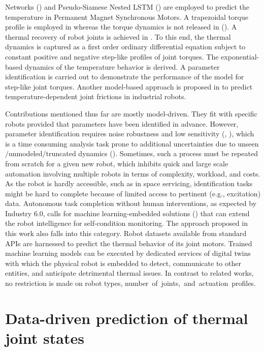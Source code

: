 \documentclass{ifacconf}
\begin{document}
Networks (\cite{he2024rotor})  and   Pseudo-Siamese Nested LSTM (\cite{cai2021temperature}) are employed to predict the temperature in Permanent Magnet Synchronous Motors. A trapezoidal torque profile is employed in \cite{he2024rotor} whereas the torque dynamics is not released in (\cite{cai2021temperature}). A thermal recovery of robot joints is achieved in  \cite{jorgensen2019thermal}. To this end, the thermal dynamics is captured as a first order ordinary differential equation subject to constant positive and negative step-like profiles of joint torques. The exponential-based dynamics of the temperature behavior is derived.  A parameter identification is carried out to demonstrate the performance of the model for step-like joint torques. Another model-based approach is proposed in \cite{trinh2023modeling} to predict temperature-dependent joint frictions in industrial robots.

Contributions mentioned thus far are mostly model-driven. They fit  with specific robots provided that parameters have been  identified in advance. However, parameter identification requires   noise robustness and low  sensitivity (\cite{zhang2024model}, \cite{de2024non}), which is a time consuming analysis task  prone to additional uncertainties due to unseen$\slash$unmodeled$\slash$truncated dynamics (\cite{shang2024general}). Sometimes, such a process must  be repeated from scratch for a given new robot, which inhibits quick and large scale automation involving multiple robots in terms of complexity, workload, and costs. As the robot is hardly accessible, such as in space servicing,  identification tasks might be hard to complete because of limited access to pertinent (e.g., excitation) data. Autonomous task completion without human interventions, as expected by Industry 6.0, calls for machine learning-embedded solutions (\cite{carayannis2024toward}) that can extend the robot intelligence for self-condition monitoring. The approach proposed in this work also falls into this category. Robot datasets available from standard APIs are harnessed to predict the thermal behavior of its joint motors. Trained machine learning models can be executed by dedicated services of  digital twins with which the physical robot is embedded to detect, communicate to other entities, and anticipate  detrimental thermal issues. In contrast to related works, no restriction is made  on  robot types, \mbox{number of joints, and actuation profiles.}

\section{Data-driven prediction of  thermal joint states}
\end{document}
